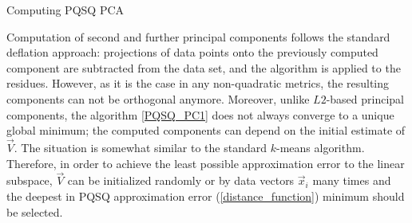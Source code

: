 \documentclass[preprint,12pt]{elsarticle}
\makeatletter
\def\BState{\State\hskip-\ALG@thistlm}
\makeatother
\begin{document}
\begin{algorithm}
\caption{Computing PQSQ PCA}\label{PQSQ_PC1}
\end{algorithm}

Computation of second and further principal components follows the standard deflation approach: projections of data points onto the previously computed component are subtracted from the data set, and the algorithm is applied to the residues. However, as it is the case in any non-quadratic metrics, the resulting components can not be orthogonal anymore.
Moreover, unlike $L2$-based principal components, the algorithm \ref{PQSQ_PC1} does not always converge to a unique global minimum; the computed components can depend on the initial estimate of $\vec{V}$. The situation is somewhat similar to the standard $k$-means algorithm. Therefore, in order to achieve the least possible approximation error to the linear subspace, $\vec{V}$ can be initialized randomly or by data vectors $\vec{x}_i$ many times and the deepest in PQSQ approximation error (\ref{distance_function}) minimum should be selected.
\end{document}
